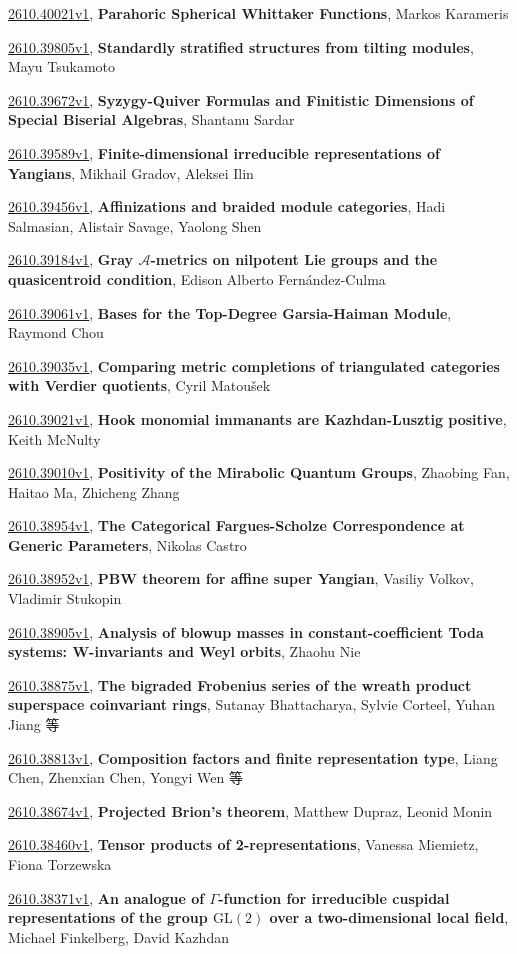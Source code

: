 \documentclass[9pt, a4paper]{article}
\theoremstyle{plain}
\theoremstyle{definition}
\theoremstyle{remark}
\newcommand{\arxiv}[3]{\href{https://arxiv.org/abs/#1}{#1}, \textbf{\textcolor{arxivblue}{#2}}, #3}
\begin{document}
\arxiv{2610.40021v1}{Parahoric Spherical Whittaker Functions}{Markos Karameris}

\arxiv{2610.39805v1}{Standardly stratified structures from tilting modules}{Mayu Tsukamoto}

\arxiv{2610.39672v1}{Syzygy-Quiver Formulas and Finitistic Dimensions of Special Biserial Algebras}{Shantanu Sardar}

\arxiv{2610.39589v1}{Finite-dimensional irreducible representations of Yangians}{Mikhail Gradov, Aleksei Ilin}

\arxiv{2610.39456v1}{Affinizations and braided module categories}{Hadi Salmasian, Alistair Savage, Yaolong Shen}

\arxiv{2610.39184v1}{Gray $\mathcal{A}$-metrics on nilpotent Lie groups and the quasicentroid condition}{Edison Alberto Fernández-Culma}

\arxiv{2610.39061v1}{Bases for the Top-Degree Garsia-Haiman Module}{Raymond Chou}

\arxiv{2610.39035v1}{Comparing metric completions of triangulated categories with Verdier quotients}{Cyril Matoušek}

\arxiv{2610.39021v1}{Hook monomial immanants are Kazhdan-Lusztig positive}{Keith McNulty}

\arxiv{2610.39010v1}{Positivity of the Mirabolic Quantum Groups}{Zhaobing Fan, Haitao Ma, Zhicheng Zhang}

\arxiv{2610.38954v1}{The Categorical Fargues-Scholze Correspondence at Generic Parameters}{Nikolas Castro}

\arxiv{2610.38952v1}{PBW theorem for affine super Yangian}{Vasiliy Volkov, Vladimir Stukopin}

\arxiv{2610.38905v1}{Analysis of blowup masses in constant-coefficient Toda systems: W-invariants and Weyl orbits}{Zhaohu Nie}

\arxiv{2610.38875v1}{The bigraded Frobenius series of the wreath product superspace coinvariant rings}{Sutanay Bhattacharya, Sylvie Corteel, Yuhan Jiang 等}

\arxiv{2610.38813v1}{Composition factors and finite representation type}{Liang Chen, Zhenxian Chen, Yongyi Wen 等}

\arxiv{2610.38674v1}{Projected Brion's theorem}{Matthew Dupraz, Leonid Monin}

\arxiv{2610.38460v1}{Tensor products of 2-representations}{Vanessa Miemietz, Fiona Torzewska}

\arxiv{2610.38371v1}{An analogue of $Γ$-function for irreducible cuspidal representations of the group $\mathrm{GL}(2)$ over a two-dimensional local field}{Michael Finkelberg, David Kazhdan}
\end{document}
